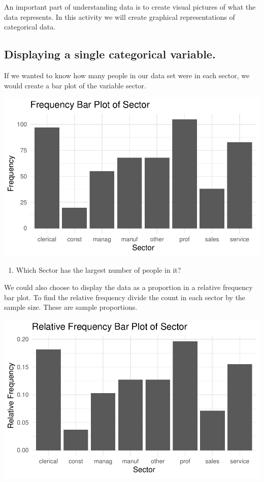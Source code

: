 \documentclass[
]{report}
\providecommand{\tightlist}{%
  \setlength{\itemsep}{0pt}\setlength{\parskip}{0pt}}
\begin{document}
\vspace{0.5in}

An important part of understanding data is to create visual pictures of what the data represents. In this activity we will create graphical representations of categorical data.

\hypertarget{displaying-a-single-categorical-variable.}{%
\subsection{Displaying a single categorical variable.}\label{displaying-a-single-categorical-variable.}}

If we wanted to know how many people in our data set were in each sector, we would create a bar plot of the variable sector.

\begin{center}\includegraphics[width=0.7\linewidth]{03-EDA-categorical_files/figure-latex/unnamed-chunk-3-1} \end{center}

\begin{enumerate}
\def\labelenumi{\arabic{enumi}.}
\setcounter{enumi}{3}
\tightlist
\item
  Which Sector has the largest number of people in it?
\end{enumerate}

\vspace{0.5in}

We could also choose to display the data as a proportion in a relative frequency bar plot. To find the relative frequency divide the count in each sector by the sample size. These are sample proportions.

\begin{center}\includegraphics[width=0.7\linewidth]{03-EDA-categorical_files/figure-latex/unnamed-chunk-4-1} \end{center}
\end{document}
